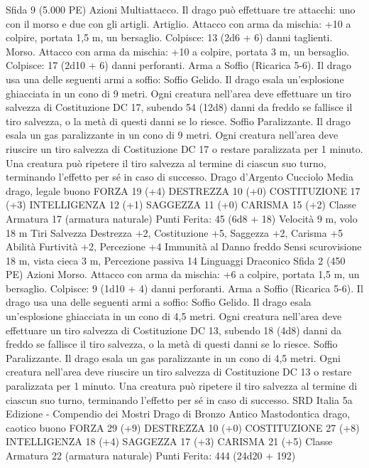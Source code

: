 \begin{multicols}{2}
Sfida 9 (5.000 PE)
Azioni
Multiattacco. Il drago può effettuare tre attacchi: uno con il
morso e due con gli artigli.
Artiglio. Attacco con arma da mischia: +10 a colpire, portata 1,5
m, un bersaglio.
Colpisce: 13 (2d6 + 6) danni taglienti.
Morso. Attacco con arma da mischia: +10 a colpire, portata 3 m,
un bersaglio.
Colpisce: 17 (2d10 + 6) danni perforanti.
Arma a Soffio (Ricarica 5-6). Il drago usa una delle seguenti armi
a soffio:
Soffio Gelido. Il drago esala un’esplosione ghiacciata in un cono di 9
metri. Ogni creatura nell’area deve effettuare un tiro salvezza di
Costituzione DC 17, subendo 54 (12d8) danni da freddo se fallisce il
tiro salvezza, o la metà di questi danni se lo riesce.
Soffio Paralizzante. Il drago esala un gas paralizzante in un cono di 9
metri. Ogni creatura nell’area deve riuscire un tiro salvezza di
Costituzione DC 17 o restare paralizzata per 1 minuto. Una creatura
può ripetere il tiro salvezza al termine di ciascun suo turno,
terminando l’effetto per sé in caso di successo.
Drago d’Argento Cucciolo
Media drago, legale buono
FORZA 19 (+4)
DESTREZZA 10 (+0)
COSTITUZIONE 17 (+3)
INTELLIGENZA 12 (+1)
SAGGEZZA 11 (+0)
CARISMA 15 (+2)
Classe Armatura 17 (armatura naturale)
\hspace*{0pt}\hfill{Punti Ferita}: 45 (6d8 + 18)
Velocità 9 m, volo 18 m
Tiri Salvezza Destrezza +2, Costituzione +5, Saggezza +2,
Carisma +5
Abilità Furtività +2, Percezione +4
Immunità al Danno freddo
Sensi scurovisione 18 m, vista cieca 3 m, Percezione passiva 14
Linguaggi Draconico
Sfida 2 (450 PE)
Azioni
Morso. Attacco con arma da mischia: +6 a colpire, portata 1,5
m, un bersaglio.
Colpisce: 9 (1d10 + 4) danni perforanti.
Arma a Soffio (Ricarica 5-6). Il drago usa una delle seguenti armi
a soffio:
Soffio Gelido. Il drago esala un’esplosione ghiacciata in un cono di
4,5 metri. Ogni creatura nell’area deve effettuare un tiro salvezza di
Costituzione DC 13, subendo 18 (4d8) danni da freddo se fallisce il
tiro salvezza, o la metà di questi danni se lo riesce.
Soffio Paralizzante. Il drago esala un gas paralizzante in un cono di
4,5 metri. Ogni creatura nell’area deve riuscire un tiro salvezza di
Costituzione DC 13 o restare paralizzata per 1 minuto. Una creatura
può ripetere il tiro salvezza al termine di ciascun suo turno,
terminando l’effetto per sé in caso di successo.
SRD Italia 5a Edizione - Compendio dei Mostri
Drago di Bronzo Antico
Mastodontica drago, caotico buono
FORZA 29 (+9)
DESTREZZA 10 (+0)
COSTITUZIONE 27 (+8)
INTELLIGENZA 18 (+4)
SAGGEZZA 17 (+3)
CARISMA 21 (+5)
Classe Armatura 22 (armatura naturale)
\hspace*{0pt}\hfill{Punti Ferita}: 444 (24d20 + 192)

\end{multicols}
